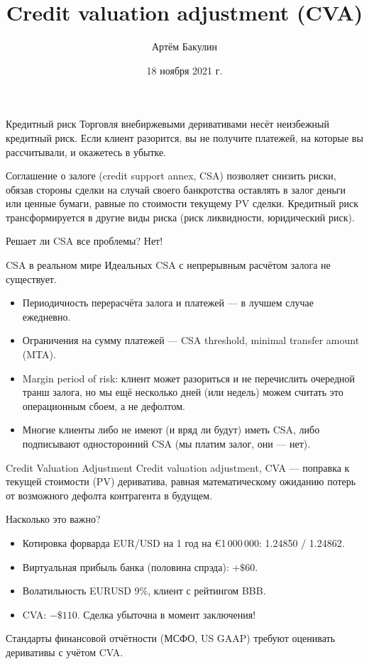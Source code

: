 \documentclass{beamer}
\title{Credit valuation adjustment (CVA)}
\author{Артём Бакулин}
\date{18 ноября 2021 г.}
\begin{document}
\begin{frame}
\titlepage
\end{frame}




\begin{frame}{Кредитный риск}
\justify
Торговля внебиржевыми деривативами несёт неизбежный кредитный риск. Если клиент разорится, вы не получите платежей, на которые вы рассчитывали, и окажетесь в убытке.

\vspace{\baselineskip}
Соглашение о залоге (credit support annex, CSA) позволяет снизить риски, обязав стороны сделки на случай своего банкротства оставлять в залог деньги или ценные бумаги, равные по стоимости текущему PV сделки. Кредитный риск трансформируется в другие виды риска (риск ликвидности, юридический риск).

\vspace{\baselineskip}
Решает ли CSA все проблемы? Нет!
\end{frame}

\begin{frame}{CSA в реальном мире}
\justify
Идеальных CSA с непрерывным расчётом залога не существует.
\begin{itemize}
\justifying
\item Периодичность перерасчёта залога и платежей --- в лучшем случае ежедневно.
\item Ограничения на сумму платежей --- CSA threshold, minimal transfer amount (MTA).
\item Margin period of risk: клиент может разориться и не перечислить очередной транш залога, но мы ещё несколько дней (или недель) можем считать это операционным сбоем, а не дефолтом.
\item Многие клиенты либо не имеют (и вряд ли будут) иметь CSA, либо подписывают односторонний CSA (мы платим залог, они --- нет).
\end{itemize}
\end{frame}



\begin{frame}{Credit Valuation Adjustment}
\justify
Credit valuation adjustment, CVA --- поправка к текущей стоимости (PV) дериватива, равная математическому ожиданию потерь от возможного дефолта контрагента в будущем.

\vspace{\baselineskip}
Насколько это важно?
\begin{itemize}
\item Котировка форварда EUR/USD на 1 год на \euro 1\,000\,000: 1.24850 / 1.24862.
\item Виртуальная прибыль банка (половина спрэда): \alert{$+\$60$}.
\item Волатильность EURUSD 9\%, клиент с рейтингом BBB.
\item CVA: \alert{$-\$110$}. Сделка убыточна в момент заключения!
\end{itemize}

\vspace{\baselineskip}
Стандарты финансовой отчётности (МСФО, US GAAP) требуют оценивать деривативы с учётом CVA.
\end{frame}
\end{document}
